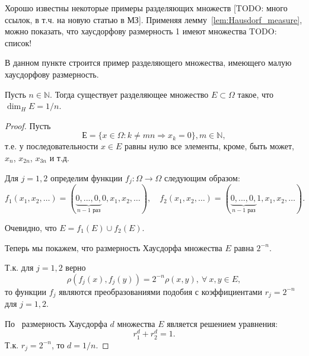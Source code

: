 Хорошо известны некоторые примеры разделяющих множеств
[TODO: много ссылок, в т.ч. на новую статью в МЗ].
Применяя лемму~\ref{lem:Hausdorf_measure}, можно показать,
что хаусдорфову размерность 1 имеют множества
TODO: список!

В данном пункте строится пример разделяющего множества,
имеющего малую хаусдорфову размерность.


\begin{theorem}
	\label{thm:Hausdorf_measure_1_n}
	Пусть $n\in\mathbb{N}$.
	Тогда существует разделяющее множество $E\subset\Omega$ такое,
	что $\dim_H E = 1/n$.
\end{theorem}

\begin{proof}
	Пусть
	\begin{equation}
		Е= \{ x \in \Omega : k \neq mn \Rightarrow x_k = 0\}, m\in \mathbb{N}
		,
	\end{equation}
	т.е. у последовательности $x \in E$ равны нулю все элементы, кроме, быть может, $x_n$, $x_{2n}$, $x_{3n}$ и т.д.

	Для $j=1,2$ определим функции $f_j : \Omega \to \Omega$ следующим образом:
	\begin{equation}
		f_1(x_1, x_2, \dots)=(\underbrace{0, ..., 0,}_{\mbox{$n-1$ раз}} 0, x_1, x_2, \dots)
		,
		\quad
		f_2(x_1, x_2, \dots)=(\underbrace{0, ..., 0,}_{\mbox{$n-1$ раз}} 1, x_1, x_2, \dots)
		.
	\end{equation}

	Очевидно, что $E=f_1(E)\cup f_2(E).$

	Теперь мы покажем, что размерность Хаусдорфа множества $E$ равна $2^{-n}$.

	Т.к. для $j=1,2$ верно
	 $$\rho(f_j(x),f_j(y))=2^{-n}\rho(x,y), \ \forall \ x, y \in E,$$
	 то функции $f_j$ являются преобразованиями подобия с коэффициентами $r_j=2^{-n}$ для $j=1,2$.


	По~\cite[Теорема 9.3]{Edgar} размерность Хаусдорфа $d$ множества $E$ является решением уравнения:
	$$ r_1^d+r_2^d=1.$$
	Т.к. $r_j=2^{-n}$, то
	$d=1/n.$
\end{proof}

